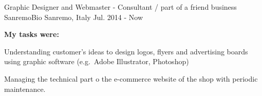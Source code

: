 {\begin{cventries}
  \cventry
  {Graphic Designer and Webmaster - Consultant / part of a friend business} %
  {SanremoBio} %
  {Sanremo, Italy} %
  {Jul. 2014 - Now} %
  {
    \begin{cvparagraph}
      \textbf{My tasks were:}
    \end{cvparagraph}
    \begin{cvitems} %
      \item {Understanding customer's ideas to design logos, flyers and advertising boards using graphic software (e.g.\ Adobe Illustrator, Photoshop)}
      \item {Managing the technical part o the e-commerce website of the shop with periodic maintenance.}
    \end{cvitems}
  }
\end{cventries}
}